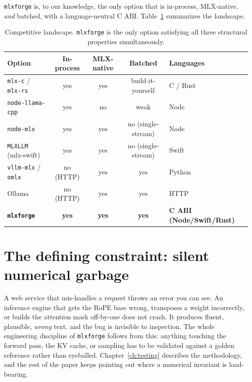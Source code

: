 \documentclass[11pt,a4paper]{report}
\newcommand{\code}[1]{\texttt{#1}}
\begin{document}
\code{mlxforge} is, to our knowledge, the only option that is in-process,
MLX-native, \emph{and} batched, with a language-neutral C ABI.
Table~\ref{tab:landscape} summarizes the landscape.

\begin{table}[t]
\centering
\caption{Competitive landscape. \code{mlxforge} is the only option satisfying all
three structural properties simultaneously.}
\label{tab:landscape}
\small
\begin{tabular}{@{}lccc l@{}}
\toprule
Option & In-process & MLX-native & Batched & Languages \\
\midrule
\code{mlx-c} / \code{mlx-rs}   & yes & yes & build-it-yourself & C / Rust \\
\code{node-llama-cpp}          & yes & no  & weak              & Node \\
\code{node-mlx}                & yes & yes & no (single-stream)& Node \\
\code{MLXLLM} (mlx-swift)      & yes & yes & no (single-stream)& Swift \\
\code{vllm-mlx} / \code{omlx}  & no (HTTP) & yes & yes          & Python \\
Ollama                         & no (HTTP) & yes & yes          & HTTP \\
\textbf{\code{mlxforge}}       & \textbf{yes} & \textbf{yes} & \textbf{yes} & \textbf{C ABI (Node/Swift/Rust)} \\
\bottomrule
\end{tabular}
\end{table}

\section{The defining constraint: silent numerical garbage}
A web service that mis-handles a request throws an error you can see. An inference
engine that gets the RoPE base wrong, transposes a weight incorrectly, or builds
the attention mask off-by-one does not crash. It produces fluent, plausible,
\emph{wrong} text, and the bug is invisible to inspection. The whole engineering
discipline of \code{mlxforge} follows from this: anything touching the forward
pass, the KV cache, or sampling has to be validated against a golden reference
rather than eyeballed. Chapter~\ref{ch:testing} describes the methodology, and the
rest of the paper keeps pointing out where a numerical invariant is load-bearing.

\end{document}
